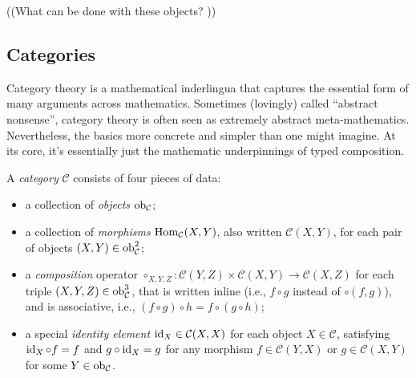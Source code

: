 ((What can be done with these objects? ))


\subsection{Categories}
Category theory is a mathematical inderlingua that captures the essential form of many arguments across mathematics. 
Sometimes (lovingly) called ``abstract nonsense'', category theory is often seen as extremely abstract meta-mathematics.  
Nevertheless, the basics more concrete and simpler than one might imagine.
At its core, it's essentially just the mathematic underpinnings of typed composition.  

\begin{defn}[category]
    A \emph{category} $\mathcal C$ consists of four pieces of data:
    \begin{itemize}[left=0pt,topsep=0pt]
        \item a collection of \emph{objects} $\operatorname{\mathop{\mathrm{ob}}}_{\cal C}$;
        \item a collection of \emph{morphisms}
            $\operatorname{\mathop{\mathrm{Hom}}}_{\mathcal C}(X,Y)$,  also written $\mathcal C(X,Y)$, for each pair of objects $(X,Y) \in \operatorname{\mathop{\mathrm{ob}}}_{\mathcal C}^2$;
        \item a \emph{composition} operator 
        $\circ_{X,Y,Z}: \mathcal C(Y,Z) \times \mathcal C(X,Y) \to \mathcal C(X,Z)$ for each triple $(X,Y,Z) \in \operatorname{\mathop{\mathrm{ob}}}_{\cal C}^3$, that is written inline (i.e., $f \circ g$ instead of $\circ(f,g)$), and is associative, i.e., $(f \circ g) \circ h = f \circ (g \circ h)$;
        \item a special \emph{identity element} $\operatorname{\mathrm{id}}_{X} \in \mathcal C(X,X)$ for each object $X \in \mathcal C$, satisfying $\operatorname{\mathrm{id}}_X \circ f = f$ and $g \circ \operatorname{\mathrm{id}}_X = g$ for any morphism $f \in \mathcal C(Y,X)$ or $g \in \mathcal C(X,Y)$ for some $Y \in \operatorname{\mathop{\mathrm{ob}}}_{\mathcal C}$.
        \qedhere
    \end{itemize}    
\end{defn}

